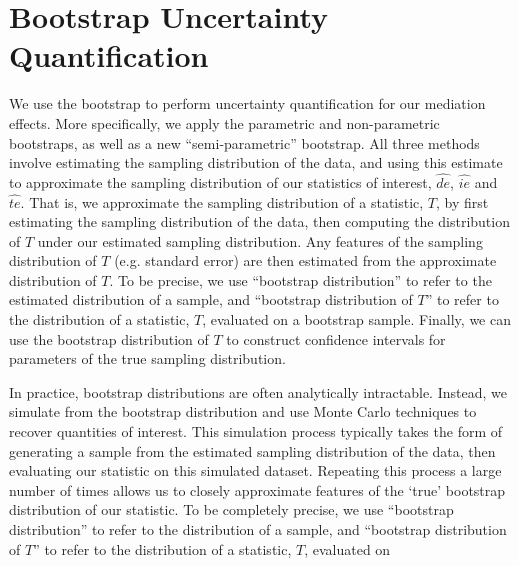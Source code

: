 \documentclass{article}
\begin{document}
\section{Bootstrap Uncertainty Quantification}

We use the bootstrap to perform uncertainty quantification for our mediation effects. More specifically, we apply the parametric and non-parametric bootstraps, as well as a new ``semi-parametric'' bootstrap. All three methods involve estimating the sampling distribution of the data, and using this estimate to approximate the sampling distribution of our statistics of interest, $\hat{de}$, $\hat{ie}$ and $\hat{te}$. That is, we approximate the sampling distribution of a statistic, $T$, by first estimating the sampling distribution of the data, then computing the distribution of $T$ under our estimated sampling distribution. Any features of the sampling distribution of $T$ (e.g. standard error) are then estimated from the approximate distribution of $T$. To be precise, we use ``bootstrap distribution'' to refer to the estimated distribution of a sample, and ``bootstrap distribution of $T$'' to refer to the distribution of a statistic, $T$, evaluated on a bootstrap sample\footnotemark. Finally, we can use the bootstrap distribution of $T$ to construct confidence intervals for parameters of the true sampling distribution.


In practice, bootstrap distributions are often analytically intractable. Instead, we simulate from the bootstrap distribution and use Monte Carlo techniques to recover quantities of interest. This simulation process typically takes the form of generating a sample from the estimated sampling distribution of the data, then evaluating our statistic on this simulated dataset. Repeating this process a large number of times allows us to closely approximate features of the `true' bootstrap distribution of our statistic. To be completely precise, we use ``bootstrap distribution'' to refer to the distribution of a sample, and ``bootstrap distribution of $T$'' to refer to the distribution of a statistic, $T$, evaluated on
\end{document}
